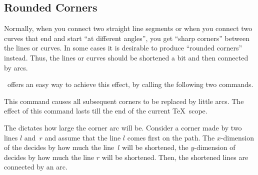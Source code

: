 \subsection{Rounded Corners}

Normally, when you connect two straight line segments or when you connect two
curves that end and start ``at different angles'', you get ``sharp corners''
between the lines or curves. In some cases it is desirable to produce ``rounded
corners'' instead. Thus, the lines or curves should be shortened a bit and then
connected by arcs.

\pgfname\ offers an easy way to achieve this effect, by calling the following
two commands.

\begin{command}{\pgfsetcornersarced{}}
    This command causes all subsequent corners to be replaced by little
    arcs. The effect of this command lasts till the end of the current
    \TeX\ scope.

    The  dictates how large the corner arc will be. Consider a
    corner made by two lines $l$ and~$r$ and assume that the line $l$ comes
    first on the path. The $x$-dimension of the  decides by how
    much the line~$l$ will be shortened, the $y$-dimension of 
    decides by how much the line $r$ will be shortened. Then, the shortened
    lines are connected by an arc.
\begin{codeexample}[]
\end{codeexample}

\begin{codeexample}[]
\end{codeexample}


\end{command}
